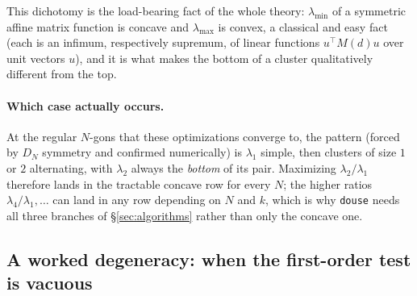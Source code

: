 \documentclass[11pt]{article}
\newcommand{\code}[1]{\texttt{#1}}
\newcommand{\lammin}{\lambda_{\min}}
\newcommand{\lammax}{\lambda_{\max}}
\theoremstyle{plain}
\begin{document}
This dichotomy is the load-bearing fact of the whole theory: $\lammin$ of a symmetric affine
matrix function is concave and $\lammax$ is convex, a classical and easy fact (each is an infimum,
respectively supremum, of linear functions $u^\top M(d)u$ over unit vectors $u$), and it is what
makes the bottom of a cluster qualitatively different from the top.

\paragraph{Which case actually occurs.} At the regular $N$-gons that these optimizations converge
to, the pattern (forced by $D_N$ symmetry and confirmed numerically) is $\lambda_1$ simple, then
clusters of size $1$ or $2$ alternating, with $\lambda_2$ always the \emph{bottom} of its pair.
Maximizing $\lambda_2/\lambda_1$ therefore lands in the tractable concave row for every $N$; the
higher ratios $\lambda_4/\lambda_1,\dots$ can land in any row depending on $N$ and $k$, which is
why \code{douse} needs all three branches of \S\ref{sec:algorithms} rather than only the concave
one.

\subsection{A worked degeneracy: when the first-order test is vacuous}\label{sec:vacuous}
\end{document}
